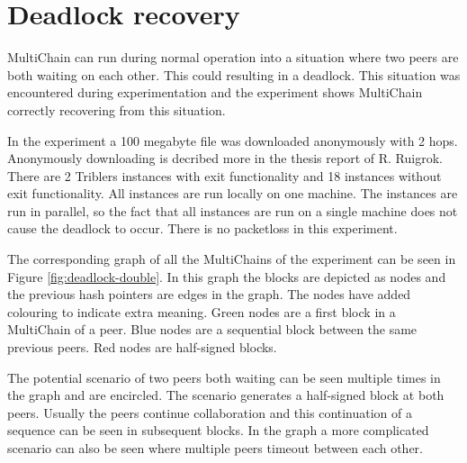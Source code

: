 \section{Deadlock recovery}
\label{exp:deadlock}
MultiChain can run during normal operation into a situation
where two peers are both waiting on each other.
This could resulting in a deadlock.
This situation was encountered during experimentation
and the experiment shows MultiChain correctly recovering from this situation.

In the experiment a 100 megabyte file was downloaded anonymously with 2 hops.
Anonymously downloading is decribed more in the thesis report of R. Ruigrok\cite{ruigrok-anonymous}.
There are 2 Triblers instances with exit functionality and 18 instances without exit functionality.
All instances are run locally on one machine.
The instances are run in parallel,
so the fact that all instances are run on a single machine does not cause the deadlock to occur.
There is no packetloss in this experiment.

The corresponding graph of all the MultiChains of the experiment can be seen in Figure \ref{fig:deadlock-double}.
In this graph the blocks are depicted as nodes and the previous hash pointers are edges in the graph.
The nodes have added colouring to indicate extra meaning.
Green nodes are a first block in a MultiChain of a peer.
Blue nodes are a sequential block between the same previous peers.
Red nodes are half-signed blocks.

The potential scenario of two peers both waiting can be seen multiple times in the graph and are encircled.
The scenario generates a half-signed block at both peers.
Usually the peers continue collaboration and this continuation of a sequence can be seen in subsequent blocks.
In the graph a more complicated scenario can also be seen where multiple peers timeout between each other.

